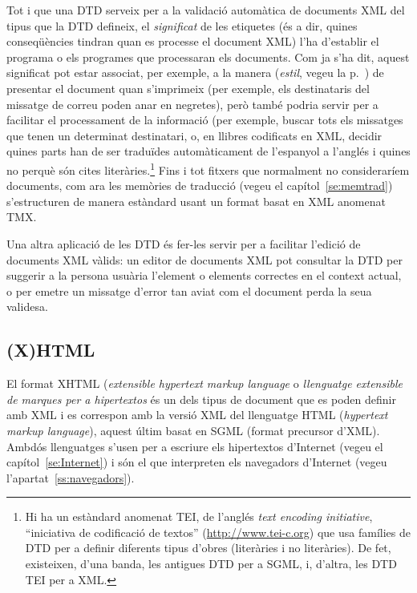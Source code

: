 Tot i que una DTD serveix per a la validació automàtica de documents
XML del tipus que la DTD defineix, el \emph{significat} de les
etiquetes (és a dir, quines conseqüències tindran quan es processe el
document XML) l'ha d'establir el programa o els programes que
processaran els documents.  Com ja s'ha dit, aquest significat pot
estar associat, per exemple, a la manera (\emph{estil}, vegeu la
p.~\pageref{pg:estil}) de presentar el document quan s'imprimeix (per
exemple, els destinataris del missatge de correu poden anar en
negretes), però també podria servir per a facilitar el processament de
la informació (per exemple, buscar tots els missatges que tenen un
determinat destinatari, o, en llibres codificats en XML, decidir
quines parts han de ser traduïdes automàticament de l'espanyol a
l'anglés i quines no perquè són cites literàries.\footnote{Hi ha un
  estàndard anomenat TEI, de l'anglés \emph{text encoding initiative},
  ``iniciativa de codificació de textos'' (\url{http://www.tei-c.org})
  que usa famílies de DTD per a definir diferents tipus d'obres
  (literàries i no literàries). De fet, existeixen, d'una banda, les
  antigues DTD per a SGML, i, d'altra, les DTD TEI per a XML.}  Fins i
tot fitxers que normalment no consideraríem documents, com ara les
memòries de traducció (vegeu el capítol~\ref{se:memtrad})
s'estructuren de manera estàndard usant un format basat en XML
anomenat TMX.

Una altra aplicació de les DTD és fer-les servir per a facilitar
l'edició de documents XML vàlids: un editor de documents XML pot
consultar la DTD per suggerir a la persona usuària l'element o
elements correctes en el context actual, o per emetre un missatge
d'error tan aviat com el document perda la seua validesa.

\subsection{(X)HTML}
\label{s3:HTML}

El format XHTML (\emph{extensible hypertext markup language} o
\emph{llenguatge extensible de marques per a hipertextos} és un dels
tipus de document que es poden definir amb XML i es correspon amb la
versió XML del llenguatge HTML (\emph{hypertext markup language}),
aquest últim basat en SGML (format precursor d'XML). Ambdós
llenguatges s'usen per a escriure els hipertextos d'Internet (vegeu el
capítol~\ref{se:Internet}) i són el que interpreten els navegadors
d'Internet (vegeu l'apartat~\ref{ss:navegadors}).


